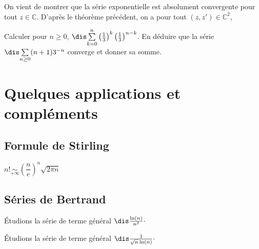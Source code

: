 \documentclass[french,11pt,twoside]{VcCours}
\newcommand{\Sum}[2]{\ensuremath{\textstyle{\sum\limits_{#1}^{#2}}}}
\begin{document}
On vient de montrer que la série exponentielle est absolument convergente pour tout $z \in \mathbb{C}$. D'après le théorème précédent, on a pour tout $(z,z') \in \mathbb{C}^2$,


\vspace{7cm}

\begin{exa}
Calculer pour $n \geq 0$, $\dis \Sum{k=0}{n}  \left( \frac{1}{3} \right)^k \left( \frac{1}{3} \right)^{n-k}$. En déduire que la série $\dis \Sum{n \geq 0}{}  (n+1)3^{-n}$ converge et donner sa somme.
\end{exa}

\section{Quelques applications et compléments}
\subsection{Formule de Stirling}

\begin{thm}
\begin{center}
$n! \underset{ + \infty}{\sim} \left( \dfrac{n}{e}\right)^n \sqrt{2 \pi n}$
\end{center}
\end{thm}
\subsection{Séries de Bertrand}
\begin{ex} Étudions la série de terme général $\dis \frac{\ln(n)}{n^2}\cdot$

\vspace{3cm}
\end{ex}

\begin{ex} Étudions la série de terme général $\dis \frac{1}{\sqrt{n} \ln(n)}\cdot$

\vspace{3cm}
\end{ex}
\end{document}
